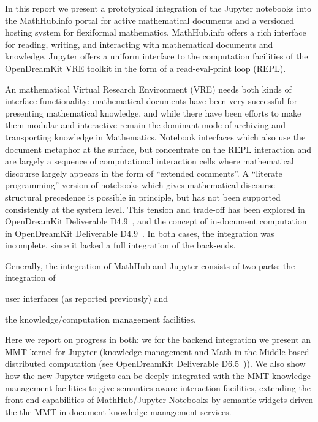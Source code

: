In this report we present a prototypical integration of the Jupyter notebooks into the MathHub.info portal for active mathematical documents and a versioned hosting system for flexiformal mathematics.
MathHub.info offers a rich interface for reading, writing, and interacting with mathematical documents and knowledge. Jupyter offers a uniform interface to the computation facilities of the OpenDreamKit VRE toolkit in the form of a read-eval-print loop (REPL).

An mathematical Virtual Research Environment (VRE) needs both kinds of interface functionality: mathematical documents have been very successful for presenting mathematical knowledge, and while there have been efforts to make them modular and interactive remain the dominant mode of archiving and transporting knowledge in Mathematics.
Notebook interfaces which also use the document metaphor at the surface, but concentrate on the REPL interaction and are largely a sequence of computational interaction cells where mathematical discourse largely appears in the form of ``extended comments''.
A ``literate programming'' version of notebooks which gives mathematical discourse structural precedence is possible in principle, but has not been supported consistently at the system level.
This tension and trade-off has been explored in OpenDreamKit Deliverable D4.9~\cite{ODK-D4.2}, and the concept of in-document computation in OpenDreamKit Deliverable D4.9~\cite{ODK-D4.9}.
In both cases, the integration was incomplete, since it lacked a full integration of the back-ends. 

Generally, the integration of MathHub and Jupyter consists of two parts: the integration of
\begin{inparaenum}[\em a\rm )]
\item user interfaces (as reported previously) and
\item the knowledge/computation management facilities. 
\end{inparaenum}
Here we report on progress in both: we for the backend integration we present an MMT kernel for Jupyter (knowledge management and Math-in-the-Middle-based distributed computation (see OpenDreamKit Deliverable D6.5~\cite{ODK-D6.5})).
We also show how the new Jupyter widgets can be deeply integrated with the MMT knowledge management facilities to give semantics-aware interaction facilities, extending the front-end capabilities of MathHub/Jupyter Notebooks by semantic widgets driven the the MMT in-document knowledge management services.
 
